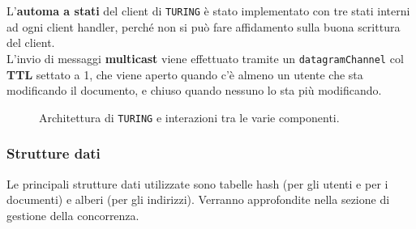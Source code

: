 L'\textbf{automa a stati} del client di \texttt{TURING} è stato implementato con tre stati interni ad ogni client handler, perché non si può fare affidamento sulla buona scrittura del client.
\medskip \\
L'invio di messaggi \textbf{multicast} viene effettuato tramite un \texttt{datagramChannel} col \textbf{TTL} settato a 1, che viene aperto quando c'è almeno un utente che sta modificando il documento, e chiuso quando nessuno lo sta più modificando.

\begin{center}
	\begin{figure}[ht!]
		\caption{Architettura di \texttt{TURING} e interazioni tra le varie componenti.}
	\end{figure}
\end{center}

\newpage

\subsubsection{Strutture dati}
Le principali strutture dati utilizzate sono tabelle hash (per gli utenti e per i documenti) e alberi (per gli indirizzi). Verranno approfondite nella sezione di gestione della concorrenza.

